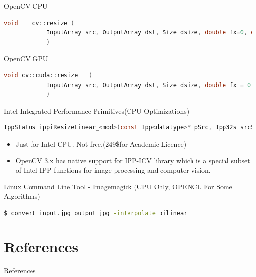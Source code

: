 \documentclass{beamer}
\begin{document}
	\begin{frame}[fragile]
		\begin{block}{OpenCV CPU}		
		
			\begin{lstlisting}[language=C]
			void 	cv::resize (
			InputArray src, OutputArray dst, Size dsize, double fx=0, double fy=0, int interpolation=INTER_LINEAR
			)
			\end{lstlisting}
		\end{block}
		\begin{block}{OpenCV GPU}		
		
			\begin{lstlisting}[language=C]
			void cv::cuda::resize	(
			InputArray src, OutputArray dst, Size dsize, double fx = 0, double fy = 0, int interpolation = INTER_LINEAR, Stream &stream=Stream::Null() 
			)	
			\end{lstlisting}
		\end{block}
	\end{frame}
	\begin{frame}[fragile]
		\begin{block}{Intel Integrated Performance Primitives(CPU Optimizations)}
			\begin{lstlisting}[language=C]
				IppStatus ippiResizeLinear_<mod>(const Ipp<datatype>* pSrc, Ipp32s srcStep, Ipp<datatype>* pDst, Ipp32s dstStep, IppiPoint dstOffset, IppiSize dstSize, IppiBorderType border, const Ipp<datatype>* pBorderValue, const IppiResizeSpec_32f* pSpec, Ipp8u* pBuffer)
			\end{lstlisting}
		\end{block}
		\begin{itemize}
			\item Just for Intel CPU. Not free.(249\$for Academic Licence)
			\item\justifying OpenCV 3.x has native support for IPP-ICV library which is a special subset of Intel IPP functions for image processing and computer vision.
		\end{itemize}
	\end{frame}
	\begin{frame}[fragile]
		\begin{block}{Linux Command Line Tool - Imagemagick (CPU Only, OPENCL For Some Algorithms)}
			\begin{lstlisting}[language=bash]
				$ convert input.jpg output jpg -interpolate bilinear
			\end{lstlisting}
		\end{block}
	\end{frame}

	
\section{References}
	\begin{block}{References}
	\end{block}
	
	
\end{document}
